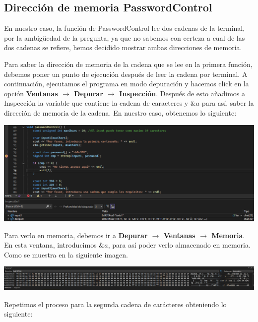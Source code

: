 \documentclass[11pt,a4paper]{article}
\begin{document}
\subsection{Dirección de memoria PasswordControl}
En nuestro caso, la función de PasswordControl lee dos cadenas de la terminal, por la ambigüedad de la pregunta, 
ya que no sabemos con certeza a cual de las dos cadenas se refiere, hemos decidido mostrar ambas direcciones de memoria.

Para saber la dirección de memoria de la cadena que se lee en la primera función, debemos poner un punto de ejecución 
después de leer la cadena por terminal. A continuación, ejecutamos el programa en modo depuración y hacemos click 
en la opción \textbf{Ventanas \(\rightarrow\) Depurar \(\rightarrow\) Inspección}. Después de esto añadimos a Inspección 
la variable que contiene la cadena de caracteres y \(\& a\) para así, saber la dirección de memoria de la cadena. En nuestro caso, obtenemos lo siguiente:
\begin{center}
\includegraphics[width=\textwidth]{texto1.png}
\end{center}
Para verlo en memoria, debemos ir a \textbf{Depurar \(\rightarrow\) Ventanas \(\rightarrow\) Memoria}. En esta ventana,
introducimos \(\& a\), para así poder verlo almacenado en memoria. Como se muestra en la siguiente imagen.
\begin{center}
  \includegraphics[width=\textwidth]{texto1Memoria.png}
  \end{center}

  Repetimos el proceso para la segunda cadena de carácteres obteniendo lo siguiente:
\end{document}
